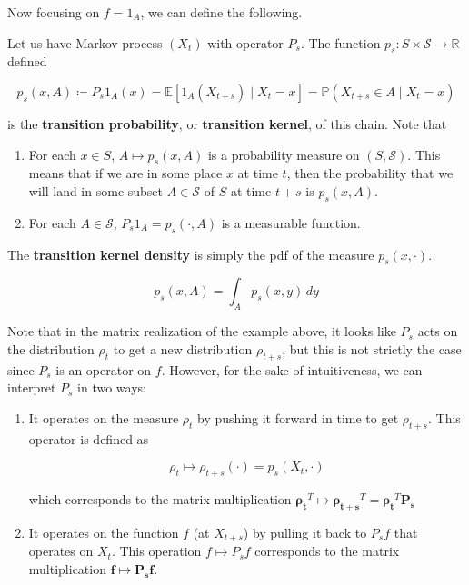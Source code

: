 \documentclass{article}
\begin{document}
  Now focusing on $f = 1_A$, we can define the following. 

  \begin{definition}
  Let us have Markov process $(X_t)$ with operator $P_s$. The function $p_s: S \times \mathcal{S} \rightarrow \mathbb{R}$ defined 

    \[p_s(x, A) \coloneqq P_s 1_A (x) = \mathbb{E}[ 1_A (X_{t+s}) \mid X_t = x] = \mathbb{P}(X_{t + s} \in A \mid X_t = x)\]

  is the \textbf{transition probability}, or \textbf{transition kernel}, of this chain. Note that 

  \begin{enumerate}
    \item For each $x \in S$, $A \mapsto p_s(x, A)$ is a probability measure on $(S, \mathcal{S})$. This means that if we are in some place $x$ at time $t$, then the probability that we will land in some subset $A \in \mathcal{S}$ of $S$ at time $t + s$ is $p_s(x, A)$. 
    \item For each $A \in \mathcal{S}$, $P_s 1_A = p_s (\cdot, A)$ is a measurable function. 
  \end{enumerate}
  The \textbf{transition kernel density} is simply the pdf of the measure $p_s(x, \cdot)$. 

    \[p_s(x, A) = \int_A p_s (x, y) \,dy\]
  \end{definition}

  Note that in the matrix realization of the example above, it looks like $P_s$ acts on the distribution $\rho_t$ to get a new distribution $\rho_{t + s}$, but this is not strictly the case since $P_s$ is an operator on $f$. However, for the sake of intuitiveness, we can interpret $P_s$ in two ways: 

  \begin{enumerate}
    \item It operates on the measure $\rho_t$ by pushing it forward in time to get $\rho_{t + s}$. This operator is defined as 

      \[\rho_t \mapsto \rho_{t + s}(\cdot) = p_s (X_t, \cdot)\]

    which corresponds to the matrix multiplication $\boldsymbol{\rho_t}^T \mapsto \boldsymbol{\rho_{t + s}}^T = \boldsymbol{\rho_{t}}^T \mathbf{P_s}$

    \item It operates on the function $f$ (at $X_{t + s}$) by pulling it back to $P_s f$ that operates on $X_t$. This operation $f \mapsto P_s f$ corresponds to the matrix multiplication $\mathbf{f} \mapsto \mathbf{P_s} \mathbf{f}$. 

  \end{enumerate}
\end{document}
